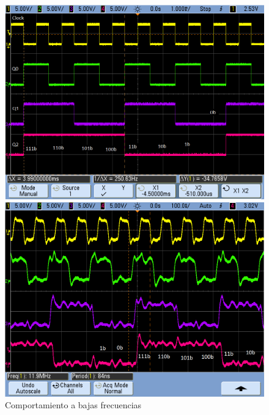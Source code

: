 \begin{figure}[H]
\begin{center}
  \begin{minipage}[b]{0.4\textwidth}
  	\begin{center}
  		\includegraphics[scale=0.2]{ejercicio7/imagenes/async.png}
  	\end{center}
  \caption{Comportamiento a bajas frecuencias}
  \label{7_fig4}
  \end{minipage}
  \begin{minipage}[b]{0.4\textwidth}
  	\begin{center}
  		\includegraphics[scale=0.2]{ejercicio7/imagenes/async2.png}
  	\end{center}

\end{minipage}
\end{center}
\end{figure}
